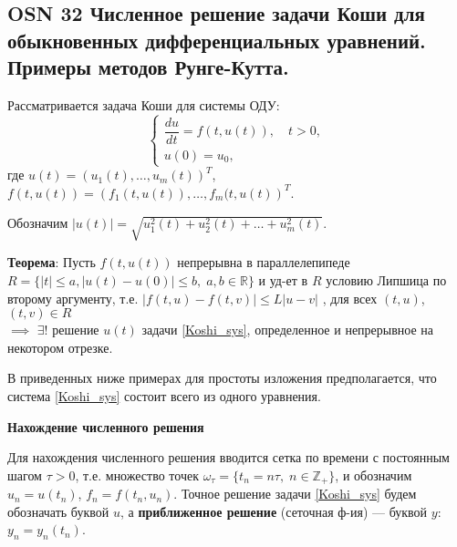 \subsection*{OSN 32 Численное решение задачи Коши для обыкновенных дифференциальных уравнений. Примеры методов Рунге-Кутта.}


Рассматривается задача Коши для системы ОДУ:
\begin{equation}
%
    \label{Koshi_sys}
    \begin{cases}
        \dfrac{du}{dt} = f(t, u(t)), \quad t > 0, \\
        u(0) = u_0,
    \end{cases}
\end{equation}
%
где
$u(t)=\left(u_1(t), \dots, u_m(t)\right)^T$, $f(t, u(t)) = \left(f_1(t, u(t)), \dots, f_m(t,u(t)\right)^T$.

Обозначим $ | u(t) | = \sqrt{u_1^2(t) + u_2^2(t) + \ldots + u_m^2(t)}$.

\textbf{Теорема}: Пусть $f(t, u(t))$ непрерывна в параллелепипеде 
$ R = \{|t| \leqslant a, | u(t)-u(0)| \leqslant b,\; a, b\in\mathbb{R}\} $ 
и уд-ет в $R$ условию Липшица по второму аргументу, т.е. 
$|f(t, u) - f(t, v)| \leqslant L|u - v|$
, для всех $(t, u)$, $(t, v) \in R$\\ 
$\implies $
$\exists!$ решение $u(t)$ задачи \eqref{Koshi_sys}, определенное и непрерывное на некотором отрезке.



В приведенных ниже примерах для простоты изложения предполагается, что
система \eqref{Koshi_sys} состоит всего из одного уравнения.

\centerline{\textbf{Нахождение численного решения}}


Для нахождения численного решения вводится сетка по времени с постоянным шагом $\tau>0$, т.е. множество точек
$\omega_\tau = \{t_n = n\tau,\;n \in \mathbb{Z}_+\}$, и обозначим
$u_n = u(t_n)$, $f_n = f(t_n, u_n)$.
Точное решение задачи \eqref{Koshi_sys} будем обозначать буквой $u$,
а \textbf{приближенное решение} (сеточная ф-ия) --- буквой $y$: $y_n = y_n(t_n)$.

